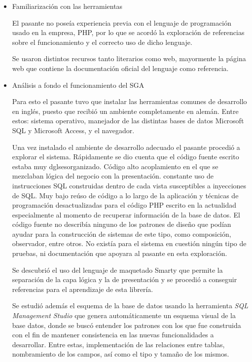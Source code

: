 \begin{itemize}
\item Familiarización con las herramientas

El pasante no poseía experiencia previa con el lenguaje de programación usado en la empresa, PHP, por lo que se acordó la exploración de referencias sobre el funcionamiento y el correcto uso de dicho lenguaje.

Se usaron distintos recursos tanto literarios como web, mayormente la página web que contiene la documentación oficial del lenguaje como referencia.

\item Análisis a fondo el funcionamiento del SGA

Para esto el pasante tuvo que instalar las herramientas comunes de desarrollo en inglés, puesto que recibió un ambiente completamente en alemán. Entre estos: sistema operativo, manejador de las distintas bases de datos Microsoft SQL y Microsoft Access, y el navegador.

Una vez instalado el ambiente de desarrollo adecuado el pasante procedió a explorar el sistema. Rápidamente se dio cuenta que el código fuente escrito estaba muy dglsesorganizado. Código alto acoplamiento en el que se mezclaban lógica del negocio con la presentación. constante uso de instrucciones \gls{SQL} construidas dentro de cada vista susceptibles a inyecciones de \gls{SQL}. Muy bajo reúso de código a lo largo de la aplicación y técnicas de programación desactualizadas para el código PHP escrito en la actualidad especialmente al momento de recuperar información de la base de datos. El código fuente no describía ninguno de los patrones de diseño que podían ayudar para la construcción de sistemas de este tipo, como composición, observador, entre otros. No existía para el sistema en cuestión ningún tipo de pruebas, ni documentación que apoyara al pasante en esta exploración.

Se descubrió el uso del lenguaje de maquetado Smarty que permite la separación de la capa lógica y la de presentación y se procedió a conseguir referencias para el aprendizaje de esta librería.

Se estudió además el esquema de la base de datos usando la herramienta \emph{SQL Management Studio} que genera automáticamente un esquema visual de la base datos, donde se buscó entender los patrones con los que fue construida con el fin de mantener consistencia en las nuevas funcionalidades a desarrollar. Entre estas, implementación de las relaciones entre tablas, nombramiento de los campos, así como el tipo y tamaño de los mismos.


\end{itemize}
